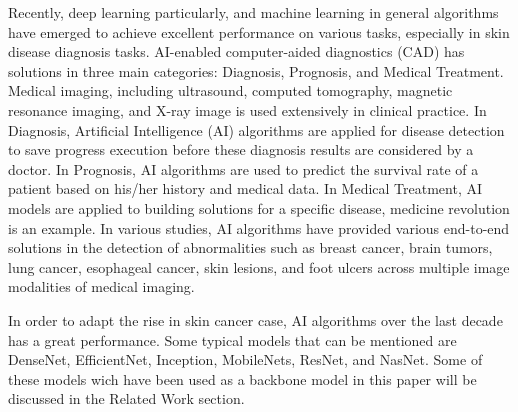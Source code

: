 \documentclass[sensors,article,submit,pdftex,moreauthors]{Definitions/mdpi}
\begin{document}
Recently, deep learning particularly, and machine learning in general algorithms have emerged to achieve excellent performance on various tasks, especially in skin disease diagnosis tasks. AI-enabled computer-aided diagnostics (CAD) has solutions in three main categories: Diagnosis, Prognosis, and Medical Treatment. Medical imaging, including ultrasound, computed tomography, magnetic resonance imaging, and X-ray image is used extensively in clinical practice. In Diagnosis, Artificial Intelligence (AI) algorithms are applied for disease detection to save progress execution before these diagnosis results are considered by a doctor. In Prognosis, AI algorithms are used to predict the survival rate of a patient based on his/her history and medical data. In Medical Treatment, AI models are applied to building solutions for a specific disease, medicine revolution is an example. In various studies, AI algorithms have provided various end-to-end solutions in the detection of abnormalities such as breast cancer, brain tumors, lung cancer, esophageal cancer, skin lesions, and foot ulcers across multiple image modalities of medical imaging\cite{11872}.

In order to adapt the rise in skin cancer case, AI algorithms over the last decade has a great performance. Some typical models that can be mentioned are DenseNet\cite{06993}, EfficientNet\cite{04861}, Inception\cite{00567}, MobileNets\cite{04861}\cite{04381}\cite{02244}, ResNet\cite{03385}\cite{05027}, and NasNet\cite{07012}. Some of these models wich have been used as a backbone model in this paper will be discussed in the Related Work section.
\end{document}
